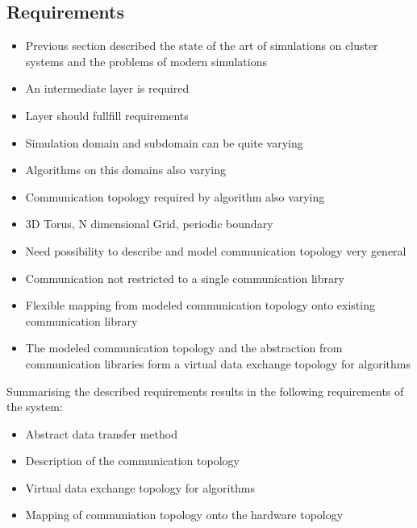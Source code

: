 \subsection{Requirements}
\label{sec:requirements}


\begin{itemize}
\item Previous section described the state of the art of simulations on cluster systems and the problems of modern simulations
\item An intermediate layer is required
\item Layer should fullfill requirements
\item Simulation domain and subdomain can be quite varying
\item Algorithms on this domains also varying
\item Communication topology required by algorithm also varying
\item 3D Torus, N dimensional Grid, periodic boundary
\item Need possibility to describe and model communication topology very general
\item Communication not restricted to a single communication library
\item Flexible mapping from modeled communication topology onto existing communication library
\item The modeled communication topology and the abstraction from communication libraries
  form a virtual data exchange topology for algorithms
\end{itemize}

Summarising the described requirements results in the
following requirements of the system:

\begin{itemize}
\item Abstract data transfer method
\item Description of the communication topology
\item Virtual data exchange topology for algorithms
\item Mapping of communiation topology onto the hardware topology
\end{itemize}

